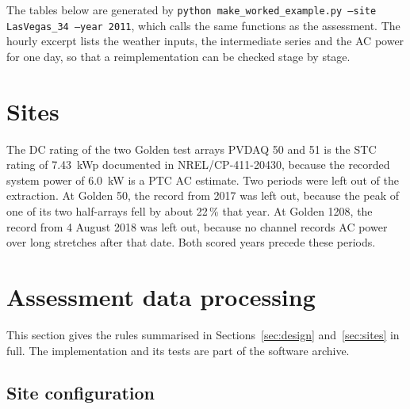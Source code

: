 \documentclass[11pt]{article}
\begin{document}
The tables below are generated by \texttt{python make\_worked\_example.py --site LasVegas\_34 --year 2011}, which calls the same functions as the assessment. The hourly excerpt lists the weather inputs, the intermediate series and the AC power for one day, so that a reimplementation can be checked stage by stage.



\section{Sites}
\label{sec:s_sites}





The DC rating of the two Golden test arrays PVDAQ 50 and 51 is the STC rating of 7.43~kWp documented in NREL/CP-411-20430, because the recorded system power of 6.0~kW is a PTC AC estimate. Two periods were left out of the extraction. At Golden 50, the record from 2017 was left out, because the peak of one of its two half-arrays fell by about 22\,\% that year. At Golden 1208, the record from 4 August 2018 was left out, because no channel records AC power over long stretches after that date. Both scored years precede these periods.

\section{Assessment data processing}
\label{sec:s_qc}

This section gives the rules summarised in Sections~\ref{sec:design} and~\ref{sec:sites} in full. The implementation and its tests are part of the software archive.

\subsection{Site configuration}
\end{document}
